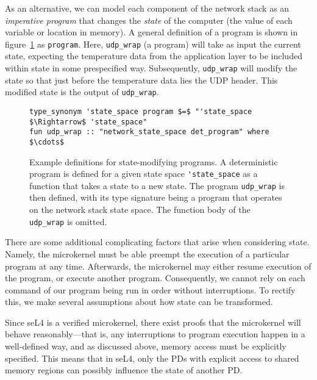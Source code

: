 \documentclass[twoside]{memoir}
\begin{document}
As an alternative, we can model each component of the network stack
as an \textit{imperative program} that changes the \textit{state} of the computer
(the value of each variable or location in memory). %
A general definition of a program is shown in figure~\ref{fig:prog-def-det-nondet} as \lstinline{program}.
Here, \lstinline{udp_wrap} (a program) will take as input the current state,
expecting the temperature data from the application layer to be included within state in some prespecified way.
Subsequently, \lstinline{udp_wrap} will modify the state so that just before the
temperature data lies the UDP header.
This modified state is the output of \lstinline{udp_wrap}.

\begin{figure}[htb]
    \centering
\begin{lstlisting}[language=isabelle]
type_synonym 'state_space program $=$ "'state_space $\Rightarrow$ 'state_space"
fun udp_wrap :: "network_state_space det_program" where $\cdots$
\end{lstlisting}
    \caption{Example definitions for state-modifying programs.
    A deterministic program is defined for a
    given state space \lstinline{'state_space}
    as a function that takes a state to a new state.
    The program \lstinline{udp_wrap} is then defined, with its type signature
    being a program that operates on the network stack state space.
    The function body of the \lstinline{udp_wrap} is omitted.
    }
    \label{fig:prog-def-det-nondet}
\end{figure}

There are some additional complicating factors that arise when considering
state.
Namely, the microkernel must be able preempt the execution
of a particular program at any time.
Afterwards, the microkernel may either resume execution of the program,
or execute another program.
Consequently, we cannot rely on each command of our program
being run in order without interruptions.
To rectify this, we make several assumptions about how state can be transformed.

Since seL4 is a verified microkernel, there exist proofs that the microkernel
will behave reasonably---that is, any interruptions to program execution
happen in a well-defined way, and as discussed above, memory access must
be explicitly specified.
This means that in seL4, only the PDs with explicit access to
shared memory regions can possibly influence the state of another PD.
\end{document}
